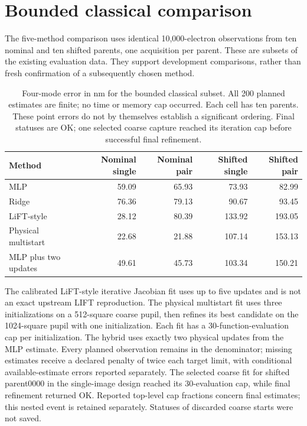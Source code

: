 \documentclass[11pt,a4paper]{article}
\begin{document}
\section{Bounded classical comparison}
The five-method comparison uses identical 10,000-electron observations from
ten nominal and ten shifted parents, one acquisition per parent. These are
subsets of the existing evaluation data. They support development comparisons,
rather than fresh confirmation of a subsequently chosen method.

\begin{table}[ht]
\centering\small
\caption{Four-mode error in nm for the bounded classical subset. All 200 planned
estimates are finite; no time or memory cap occurred. Each cell has ten parents.
These point errors do not by themselves establish a significant ordering.
Final statuses are OK; one selected coarse capture reached its iteration cap
before successful final refinement.}
\begin{tabular}{@{}lrrrr@{}}
\toprule
Method&Nominal single&Nominal pair&Shifted single&Shifted pair\\
\midrule
MLP&59.09&65.93&73.93&82.99\\
Ridge&76.36&79.13&90.67&93.45\\
LiFT-style&28.12&80.39&133.92&193.05\\
Physical multistart&22.68&21.88&107.14&153.13\\
MLP plus two updates&49.61&45.73&103.34&150.21\\
\bottomrule
\end{tabular}
\end{table}

The calibrated LiFT-style iterative Jacobian fit uses up to five updates and
is not an exact upstream LIFT reproduction. The physical multistart fit uses
three initializations on a 512-square coarse pupil, then refines its best
candidate on the 1024-square pupil with one initialization. Each fit has a
30-function-evaluation cap per initialization. The hybrid uses exactly two physical updates from
the MLP estimate. Every planned observation remains in the denominator;
missing estimates receive a declared penalty of twice each target limit,
with conditional available-estimate errors reported separately.
The selected coarse fit for shifted parent0000 in the single-image design
reached its 30-evaluation cap, while final refinement returned OK. Reported
top-level cap fractions concern final estimates; this nested event is retained
separately. Statuses of discarded coarse starts were not saved.
\end{document}
